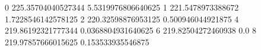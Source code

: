 0 225.35704040527344 5.5319976806640625
1 221.5478973388672 1.7228546142578125
2 220.32598876953125 0.500946044921875
4 219.86192321777344 0.0368804931640625
6 219.82504272460938 0.0
8 219.97857666015625 0.153533935546875
